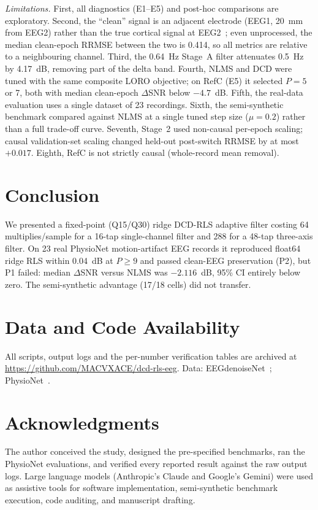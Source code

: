 \documentclass[conference]{IEEEtran}
\newcommand{\repourl}{\url{https://github.com/MACVXACE/dcd-rls-eeg}}
\begin{document}
\emph{Limitations.} First, all diagnostics (E1--E5) and post-hoc comparisons are exploratory. Second, the ``clean'' signal is an adjacent electrode (EEG1, 20~mm from EEG2) rather than the true cortical signal at EEG2~\cite{sweeney2012}; even unprocessed, the median clean-epoch RRMSE between the two is 0.414, so all metrics are relative to a neighbouring channel. Third, the 0.64~Hz Stage~A filter attenuates 0.5~Hz by 4.17~dB, removing part of the delta band. Fourth, NLMS and DCD were tuned with the same composite LORO objective; on RefC (E5) it selected $P = 5$ or 7, both with median clean-epoch $\Delta$SNR below $-4.7$~dB. Fifth, the real-data evaluation uses a single dataset of 23 recordings. Sixth, the semi-synthetic benchmark compared against NLMS at a single tuned step size ($\mu = 0.2$) rather than a full trade-off curve. Seventh, Stage~2 used non-causal per-epoch scaling; causal validation-set scaling changed held-out post-switch RRMSE by at most $+0.017$. Eighth, RefC is not strictly causal (whole-record mean removal).

\section{Conclusion}
We presented a fixed-point (Q15/Q30) ridge DCD-RLS adaptive filter costing 64 multiplies/sample for a 16-tap single-channel filter and 288 for a 48-tap three-axis filter. On 23 real PhysioNet motion-artifact EEG records it reproduced float64 ridge RLS within 0.04~dB at $P \ge 9$ and passed clean-EEG preservation (P2), but P1 failed: median $\Delta$SNR versus NLMS was $-2.116$~dB, 95\% CI entirely below zero. The semi-synthetic advantage (17/18 cells) did not transfer.

\section*{Data and Code Availability}
All scripts, output logs and the per-number verification tables are archived at \repourl. Data: EEGdenoiseNet~\cite{zhang2021}; PhysioNet~\cite{sweeney2014}.

\section*{Acknowledgments}
The author conceived the study, designed the pre-specified benchmarks, ran the PhysioNet evaluations, and verified every reported result against the raw output logs. Large language models (Anthropic's Claude and Google's Gemini) were used as assistive tools for software implementation, semi-synthetic benchmark execution, code auditing, and manuscript drafting.
\end{document}
